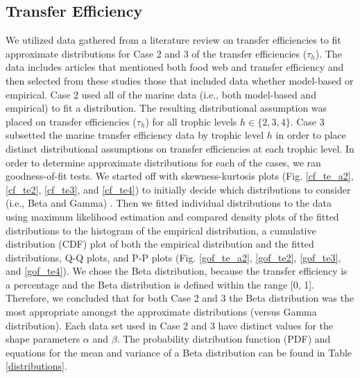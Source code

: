 \documentclass[oneside,12pt,final]{sty/ucthesis-CA2012}
\let\cite\citep                             %
\begin{document}
\begin{mainmatter}
\subsection{Transfer Efficiency}
We utilized data gathered from a literature review on transfer efficiencies to fit approximate distributions for Case 2 and 3 of the transfer efficiencies ($\tau_h$). The data includes articles that mentioned both food web and transfer efficiency and then selected from these studies those that included data whether model-based or empirical. Case 2 used all of the marine data (i.e., both model-based and empirical) to fit a distribution. The resulting distributional assumption was placed on transfer efficiencies ($\tau_h$) for all trophic levels $h \in \{2, 3, 4\}$. Case 3 subsetted the marine transfer efficiency data by trophic level $h$ in order to place distinct distributional assumptions on transfer efficiencies at each trophic level. In order to determine approximate distributions for each of the cases, we ran goodness-of-fit tests. We started off with skewness-kurtosis plots (Fig. \ref{cf_te_a2}, \ref{cf_te2}, \ref{cf_te3}, and \ref{cf_te4}) to initially decide which distributions to consider (i.e., Beta and Gamma) \cite{fitdistrplus}. Then we fitted individual distributions to the data using maximum likelihood estimation and compared density plots of the fitted distributions to the histogram of the empirical distribution, a cumulative distribution (CDF) plot of both the empirical distribution and the fitted distributions, Q-Q plots, and P-P plots (Fig. \ref{gof_te_a2}, \ref{gof_te2}, \ref{gof_te3}, and \ref{gof_te4}).  We chose the Beta distribution, because the transfer efficiency is a percentage and the Beta distribution is defined within the range [0, 1]. Therefore, we concluded that for both Case 2 and 3 the Beta distribution was the most appropriate amongst the approximate distributions (versus Gamma distribution). Each data set used in Case 2 and 3 have distinct values for the shape parameters $\alpha$ and $\beta$. The probability distribution function (PDF) and equations for the mean and variance of a Beta distribution can be found in Table \ref{distributions}.


\end{mainmatter}
\end{document}
